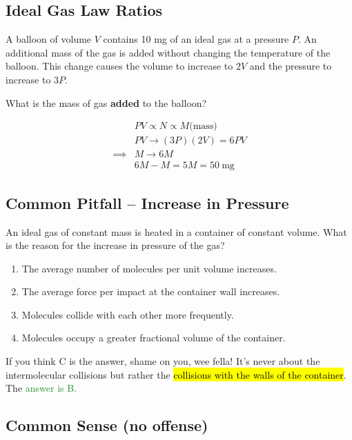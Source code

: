 \documentclass[a4paper,12pt]{article}
\begin{document}
\pagebreak

\subsection{Ideal Gas Law Ratios}

A balloon of volume $V$ contains 10 mg of an ideal gas at a pressure $P$. An additional mass of the gas is added without changing the temperature of the balloon. This change causes the volume to increase to $2V$ and the pressure to increase to $3P$.

What is the mass of gas \textbf{added} to the balloon?

\begin{align*}
           & PV \propto N \propto M \text{(mass)} \\
           & PV \to (3P)(2V) = 6PV                \\
  \implies & M \to 6M                             \\
           & 6M- M = 5M = \SI{50}{\mg}
\end{align*}

\pagebreak

\subsection{Common Pitfall -- Increase in Pressure}

An ideal gas of constant mass is heated in a container of constant volume. What is the reason for the increase in pressure of the gas?

\begin{enumerate}[label=\Alph*.]
  \item The average number of molecules per unit volume increases.
  \item The average force per impact at the container wall increases.
  \item Molecules collide with each other more frequently.
  \item Molecules occupy a greater fractional volume of the container.
\end{enumerate}

If you think C is the answer, shame on you, wee fella! It's never about the intermolecular collisions but rather the \hl{collisions with the walls of the container}. The \textcolor{ForestGreen}{answer is B.}

\pagebreak

\subsection{Common Sense (no offense)}
\end{document}
